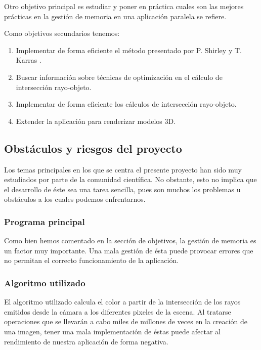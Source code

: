\documentclass[titlepage,12pt]{report}
\begin{document}
Otro objetivo principal es estudiar y poner en práctica cuales son las mejores prácticas en la gestión de memoria en una aplicación paralela se refiere.

Como objetivos secundarios tenemos:

\begin{enumerate}
	\item Implementar de forma eficiente el método presentado por P. Shirley \cite{Shirley2018a,Shirley2018b,Shirley2018a} y T. Karras \cite{Karras2012}.
	\item \label{ref:info} Buscar información sobre técnicas de optimización en el cálculo de intersección rayo-objeto.
	\item Implementar de forma eficiente los cálculos de intersección rayo-objeto.
	\item Extender la aplicación para renderizar modelos 3D.
\end{enumerate}

\subsection{Obstáculos y riesgos del proyecto}

Los temas principales en los que se centra el presente proyecto han sido muy estudiados por parte de la comunidad científica. No obstante, esto no implica que el desarrollo de éste sea una tarea sencilla, pues son muchos los problemas u obstáculos a los cuales podemos enfrentarnos.

\subsubsection{Programa principal}

Como bien hemos comentado en la sección de objetivos, la gestión de memoria es un factor muy importante. Una mala gestión de ésta puede provocar errores que no permitan el correcto funcionamiento de la aplicación.

\subsubsection{Algoritmo utilizado}

El algoritmo utilizado calcula el color a partir de la intersección de los rayos emitidos desde la cámara a los diferentes pixeles de la escena. Al tratarse operaciones que se llevarán a cabo miles de millones de veces en la creación de una imagen, tener una mala implementación de éstas puede afectar al rendimiento de nuestra aplicación de forma negativa.
\end{document}
